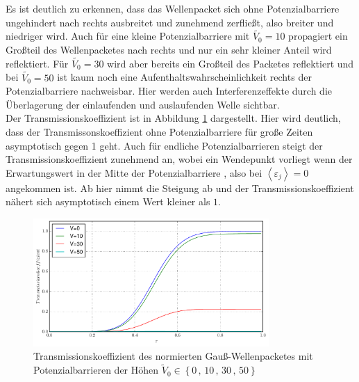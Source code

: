 Es ist deutlich zu erkennen, dass das Wellenpacket sich ohne Potenzialbarriere ungehindert nach rechts ausbreitet und zunehmend zerfließt, also breiter und niedriger wird. Auch für eine kleine Potenzialbarriere mit $\tilde{V_0}=10$ propagiert ein Großteil des Wellenpacketes nach rechts und nur ein sehr kleiner Anteil wird reflektiert. Für $\tilde{V_0}=30$ wird aber bereits ein Großteil des Packetes reflektiert und bei $\tilde{V_0}=50$ ist kaum noch eine Aufenthaltswahrscheinlichkeit rechts der Potenzialbarriere nachweisbar. Hier werden auch Interferenzeffekte durch die Überlagerung der einlaufenden und auslaufenden Welle sichtbar.\\ 
Der Transmissionskoeffizient ist in Abbildung \ref{Transmission} dargestellt. Hier wird deutlich, dass der Transmissonskoeffizient ohne Potenzialbarriere für große Zeiten asymptotisch gegen 1 geht. Auch für endliche Potenzialbarrieren steigt der Transmissionskoeffizient zunehmend an, wobei ein Wendepunkt vorliegt wenn der Erwartungswert in der Mitte der Potenzialbarriere , also bei $\left\langle\varepsilon_j\right\rangle=0$ angekommen ist. Ab hier nimmt die Steigung ab und der Transmissionskoeffizient nähert sich asymptotisch einem Wert kleiner als $1$.
 \begin{figure}[H]
\centering 
\includegraphics[width=0.8\textwidth]{Abbildungen/Transmission.pdf}
\caption{Transmissionskoeffizient des normierten Gauß-Wellenpacketes mit Potenzialbarrieren der Höhen $\tilde{V}_0\in\left\lbrace 0\,,\,10\,,\,30\,,\,50\right\rbrace$}
\label{Transmission}
\end{figure}\noindent

